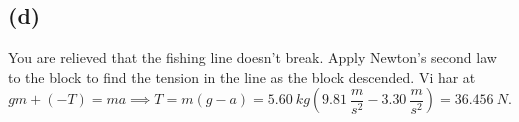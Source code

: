 \documentclass[12pt]{article}
\begin{document}
\subsection*{(d)}
You are relieved that the fishing line doesn’t break. Apply Newton’s second law to the block to find the tension in the line as the block descended.
\bigbreak
Vi har at
\[
gm + (-T) = ma \implies T = m(g-a) = \qty{5,60}{kg}\left( \qty{9,81}{\frac{m}{s^2}} - \qty{3,30}{\frac{m}{s^2}} \right) = \qty{36,456}{N}
.\] 
  
\end{document}
